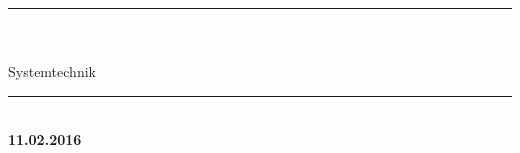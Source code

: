 
\begin{titlepage}
	
	\vspace*{\fill}

	{\begin{center} \bfseries\huge
			\rule{17.5cm}{0.1mm}  
			\\[5mm]
			\mythema\\%
			Systemtechnik
			\rule{17.5cm}{0.1mm}  
	\end{center}}
	
	{\begin{center} \bfseries\small
		\myauthor
		\myclass\\
		11.02.2016
	\end{center}}
	
	\vspace*{\fill}
	

\end{titlepage}
